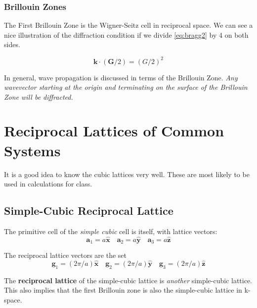\subsubsection{Brillouin Zones}
The First Brillouin Zone is the Wigner-Seitz cell in reciprocal space. We can see a nice illustration of the diffraction condition if we divide \ref{eq:bragg2} by 4 on both sides.

\begin{equation} 
    \mathbf{k}\cdot (\mathbf{G}/2) = (G/2)^2
\end{equation}

In general, wave propagation is discussed in terms of the Brillouin Zone. \emph{Any wavevector starting at the origin and terminating on the surface of the Brillouin Zone will be diffracted.}



\section{Reciprocal Lattices of Common Systems}
It is a good idea to know the cubic lattices very well. These are most likely to be used in calculations for class.

\subsection{Simple-Cubic Reciprocal Lattice}
The primitive cell of the \emph{simple cubic} cell is itself, with lattice vectors:
\begin{equation*}
    \mathbf{a}_1 = a \hat{\mathbf{x}} \quad \mathbf{a}_2 = a \hat{\mathbf{y}} \quad \mathbf{a}_3 = a \hat{\mathbf{z}}
\end{equation*}

The reciprocal lattice vectors are the set
\begin{equation*}
    \mathbf{g}_1 = (2\pi/a) \hat{\mathbf{x}} \quad \mathbf{g}_2 = (2\pi/a) \hat{\mathbf{y}} \quad \mathbf{g}_3 = (2\pi/a) \hat{\mathbf{z}}
\end{equation*}

The \textbf{reciprocal lattice} of the simple-cubic lattice is \textit{another} simple-cubic lattice. This also implies that the first Brillouin zone is also the simple-cubic lattice in k-space.